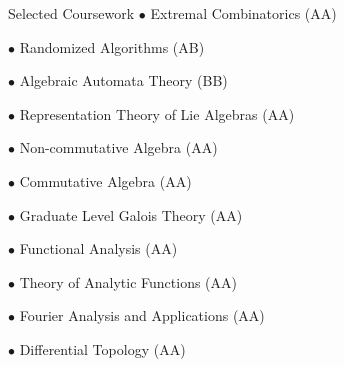 \begin{rubric}{Selected Coursework}
	$\bullet$ Extremal Combinatorics (AA)

	$\bullet$ Randomized Algorithms (AB)

	$\bullet$ Algebraic Automata Theory (BB)


	\entry*[Mathematics]
	$\bullet$ Representation Theory of Lie Algebras (AA)

	$\bullet$ Non-commutative Algebra (AA)

	$\bullet$ Commutative Algebra (AA)

	$\bullet$ Graduate Level Galois Theory (AA)

	$\bullet$ Functional Analysis (AA)

	$\bullet$ Theory of Analytic Functions (AA)

	$\bullet$ Fourier Analysis and Applications (AA)

	$\bullet$ Differential Topology (AA)
\end{rubric}